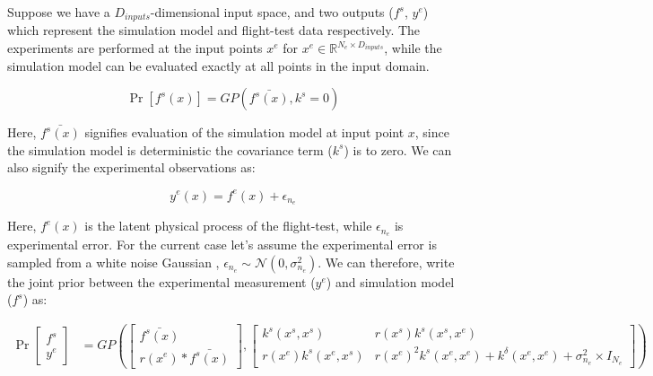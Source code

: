\begin{mdframed}[hidealllines=true,backgroundcolor=blue!20]
Suppose we have a \(D_{inputs}\)-dimensional input space, and two outputs ($f^{s}$, $y^{e}$) which represent the simulation model and flight-test data respectively. The experiments are performed at the input points $x^{e}$ for $x^e \in \mathbb{R}^{N_{e} \times D_{inputs}}$, while the simulation model can be evaluated exactly at all points in the input domain.

\begin{equation}
    \Pr[f^{s}(x)] = GP(\bar{f^{s}(x)}, k^{s} = 0)
\end{equation}

Here, $\bar{f^{s}(x)}$ signifies evaluation of the simulation model at input point $x$, since the simulation model is deterministic the covariance term ($k^s$) is to zero. We can also signify the experimental observations as:

\begin{equation}
    y^{e}(x) = f^{e}(x) + \epsilon_{n_{e}} 
\end{equation}

Here, $f^{e}(x)$ is the latent physical process of the flight-test, while $\epsilon_{n_{e}}$ is experimental error. For the current case let's assume the experimental error is sampled from a white noise Gaussian , $\epsilon_{n_{e}} \sim \mathcal{N}(0, \sigma_{n_{e}}^2)$. We can therefore, write the joint prior between the experimental measurement ($y^{e}$) and simulation model ($f^{s}$) as:

\begin{equation}
\begin{aligned}
     \Pr \begin{bmatrix}
f^{s}\\ 
y^{e}
\end{bmatrix}  & = GP\left ( \begin{bmatrix}
\bar{f^{s}(x)}\\ 
r(x^{e})*\bar{f^{s}(x)}
\end{bmatrix}, \begin{bmatrix} k^{s}(x^{s}, x^{s}) & r(x^{s})k^{s}(x^{s}, x^{e})   \\
           r(x^{e})k^{s}(x^{e}, x^{s}) & r(x^{e})^2k^{s}(x^{e}, x^{e}) + k^{\delta}(x^{e}, x^{e}) + \sigma_{n_{e}}^2 \times I_{N_{e}}\end{bmatrix}   \right )
           \end{aligned}
\end{equation}


\end{mdframed}
